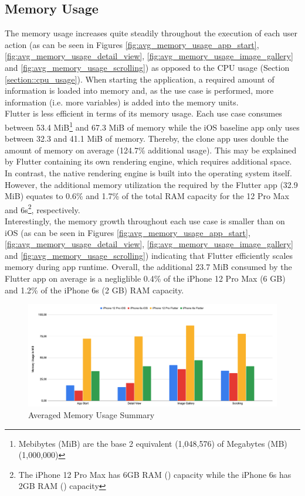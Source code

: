 \subsection{Memory Usage}
The memory usage increases quite steadily throughout the execution of each user action (as can be seen in Figures \ref{fig:avg_memory_usage_app_start}, \ref{fig:avg_memory_usage_detail_view}, \ref{fig:avg_memory_usage_image_gallery} and \ref{fig:avg_memory_usage_scrolling}) as opposed to the CPU usage (Section \ref{section::cpu_usage}).
When starting the application, a required amount of information is loaded into memory and, 
as the use case is performed, more information (i.e. more variables) is added into the memory units.\\
Flutter is less efficient in terms of its memory usage. Each use case consumes between 53.4 MiB\footnote{Mebibytes (MiB) are the base 2 equivalent (1,048,576) of Megabytes (MB) (1,000,000)} and 67.3 MiB of memory while the iOS baseline app only uses between 32.3 and 41.1 MiB of memory.
Thereby, the clone app uses double the amount of memory on average (124.7\% additional usage).
This may be explained by Flutter containing its own rendering engine, which requires additional space. In contrast, the native rendering engine is built into the operating system itself.\\
However, the additional memory utilization the required by the Flutter app (32.9 MiB) equates to 0.6\% and 1.7\% of the total RAM capacity for the 12 Pro Max and 6s\footnote{The iPhone 12 Pro Max has 6GB RAM (\cite{GSMArena12ProMax2020}) capacity while the iPhone 6s has 2GB RAM (\cite{GSMArena2015}) capacity}, respectively.\\
Interestingly, the memory growth throughout each use case is smaller than on iOS (as can be seen in Figures \ref{fig:avg_memory_usage_app_start}, \ref{fig:avg_memory_usage_detail_view}, \ref{fig:avg_memory_usage_image_gallery} and \ref{fig:avg_memory_usage_scrolling}) indicating that Flutter efficiently scales memory during app runtime.
Overall, the additional 23.7 MiB consumed by the Flutter app on average is a negliglible 0.4\% of the iPhone 12 Pro Max (6 GB) and 1.2\% of the 
iPhone 6s (2 GB) RAM capacity.

\begin{figure}[!h]
    \centering
    \includegraphics[width=\linewidth]{images/performance_results/summary_charts/avg_memory_usage_summary.png}
    \caption{Averaged Memory Usage Summary}
    \label{fig:avg_memory_usage_summary}
\end{figure}

